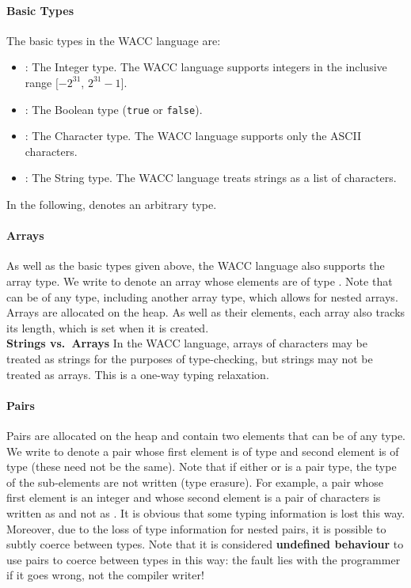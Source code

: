 \documentclass[a4paper]{article}
\newcommand{\shell}[1]{\lstinline{#1}}
\theoremstyle{definition}
\begin{document}
\paragraph{Basic Types}
The basic types in the WACC language are:
\begin{itemize}
  \item {}: The Integer type. The WACC language supports integers in the inclusive range $[-2^{31}$, $2^{31} - 1]$.
  \item {}: The Boolean type (\shell{true} or \shell{false}).
  \item {}: The Character type. The WACC language supports only the ASCII characters.
  \item {}: The String type. The WACC language treats strings as a list of characters.
\end{itemize}
In the following,  denotes an arbitrary type.

\paragraph{Arrays}
As well as the basic types given above, the WACC language also supports the array type.
We write  to denote an array whose elements are of type .
Note that  can be of any type, including another array type, which allows for nested arrays.
Arrays are allocated on the heap.
As well as their elements, each array also tracks its length, which is set when it is created.\\

\noindent \textbf{Strings vs.\ Arrays} In the WACC language, arrays of characters may be treated as strings for the purposes of type-checking, but strings may not be treated as arrays. This is a one-way typing relaxation.

\paragraph{Pairs}
Pairs are allocated on the heap and contain two elements that can be of any type.
We write  to denote a pair whose first element is of type  and second element is of type 
(these need not be the same).
Note that if either  or  is a pair type, the type of the sub-elements are not written (type erasure).
For example, a pair whose first element is an integer
and whose second element is a pair of characters is written as  and not as .
It is obvious that some typing information is lost this way.
Moreover, due to the loss of type information for nested pairs, it is possible to subtly coerce between types. Note that it is
considered \textbf{undefined behaviour} to use pairs to coerce between types in this way: the fault lies with the programmer if it
goes wrong, not the compiler writer!
\end{document}

